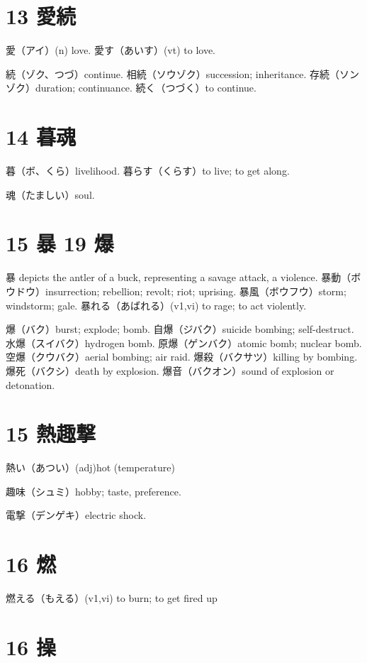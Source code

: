 \section{13 愛続}

愛（アイ）(n) love.
愛す（あいす）(vt) to love.

続（ゾク、つづ）continue.
相続（ソウゾク）succession; inheritance.
存続（ソンゾク）duration; continuance.
続く（つづく）to continue.

\section{14 暮魂}

暮（ボ、くら）livelihood.
暮らす（くらす）to live; to get along.

魂（たましい）soul.

\section{15 暴 19 爆}

暴 depicts the antler of a buck, representing a savage attack, a violence.
暴動（ボウドウ）insurrection; rebellion; revolt; riot; uprising.
暴風（ボウフウ）storm; windstorm; gale.
暴れる（あばれる）(v1,vi) to rage; to act violently.

爆（バク）burst; explode; bomb.
自爆（ジバク）suicide bombing; self-destruct.
水爆（スイバク）hydrogen bomb.
原爆（ゲンバク）atomic bomb; nuclear bomb.
空爆（クウバク）aerial bombing; air raid.
爆殺（バクサツ）killing by bombing.
爆死（バクシ）death by explosion.
爆音（バクオン）sound of explosion or detonation.

\section{15 熱趣撃}

熱い（あつい）(adj)hot (temperature)

趣味（シュミ）hobby; taste, preference.

電撃（デンゲキ）electric shock.

\section{16 燃}

燃える（もえる）(v1,vi) to burn; to get fired up

\section{16 操}

